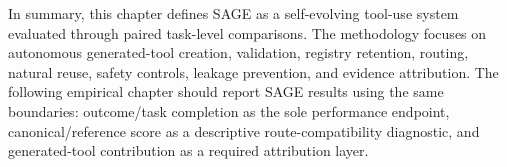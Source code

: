 In summary, this chapter defines SAGE as a self-evolving tool-use system evaluated through paired task-level comparisons. The methodology focuses on autonomous generated-tool creation, validation, registry retention, routing, natural reuse, safety controls, leakage prevention, and evidence attribution. The following empirical chapter should report SAGE results using the same boundaries: outcome/task completion as the sole performance endpoint, canonical/reference score as a descriptive route-compatibility diagnostic, and generated-tool contribution as a required attribution layer.
